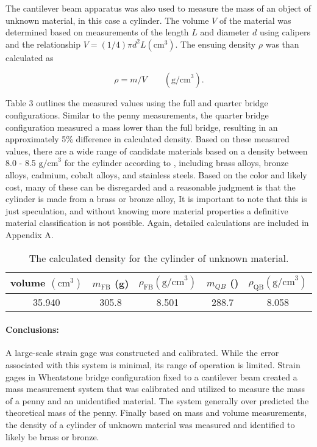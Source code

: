 \documentclass[12pt, letterpaper]{article}
\newcommand{\z}[1]{\text{#1}} %
\begin{document}
The cantilever beam apparatus was also used to measure the mass of an object
of unknown material, in this case a cylinder. The volume $V$ of the material
was determined based on measurements of the length $L$ and diameter $d$ using
calipers and the relationship $V = (1/4)\pi d^2 L (\z{cm}^3)$. The ensuing
density $\rho$ was than calculated as

\begin{equation}
   \rho = m/V \qquad (\z{g/cm}^3).
\end{equation}

Table 3 outlines the measured values using the full and quarter bridge
configurations. Similar to the penny measurements, the quarter bridge
configuration measured a mass lower than the full bridge, resulting in an
approximately 5\% difference in calculated density.   Based on these
measured values, there are a wide range of candidate materials based on a
density between 8.0 - 8.5 $\z{g/cm}^3$  for the cylinder according to
\cite{thermtest}, including brass alloys, bronze alloys, cadmium, cobalt
alloys, and stainless steels.
Based on the color and likely cost, many of these can be disregarded and a
reasonable judgment is that the cylinder is made from a brass or bronze alloy,
It is important to note that this is just speculation, and without knowing
more material properties a definitive material classification is not possible.
Again, detailed calculations are included in Appendix A.

\begin{table}
\begin{center}
   \caption{The calculated density for the cylinder of unknown material.}
\begin{tabular}{ccccc} \toprule
   volume $(\z{cm}^3)$ & $m_{\z{FB}}$ (g) & $\rho_{\z{FB}} (\z{g/cm}^3)$
   & $m_{QB}$ (\z{g}) & $\rho_{\z{QB}} (\z{g/cm}^3)$ \\ \midrule
35.940 & 305.8 & 8.501 & 288.7 & 8.058 \\ \bottomrule
\end{tabular}
\label{table3}
\end{center}
\end{table}

\paragraph{Conclusions:}
A large-scale strain gage was constructed and
calibrated. While the error associated with this system is minimal, its range
of operation is limited. Strain gages in Wheatstone bridge configuration fixed
to a cantilever beam created a mass measurement system that was calibrated and
utilized to measure the mass of a penny and an unidentified material. The
system generally over predicted the theoretical mass of the penny. Finally
based on mass and volume measurements, the density of a cylinder of unknown
material was measured and identified to likely be brass or bronze.
\end{document}
